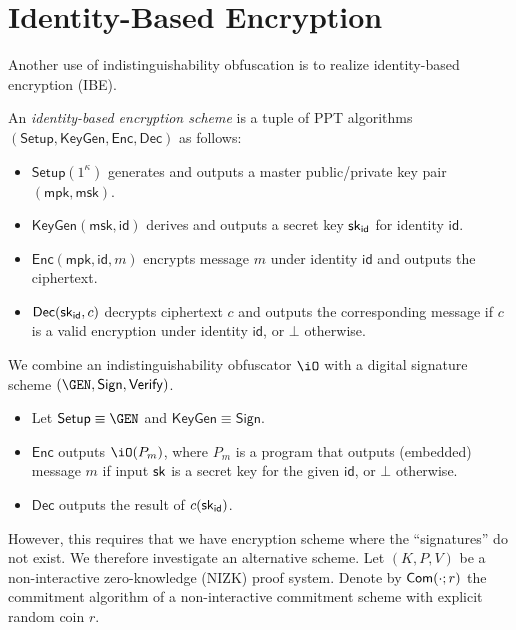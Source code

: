 \documentclass[12pt]{tufte-book}
\newcommand{\Enc}{\mathsf{Enc}}
\newcommand{\Dec}{\mathsf{Dec}}
\begin{document}
\section{Identity-Based Encryption}

Another use of indistinguishability obfuscation is to realize
identity-based encryption (IBE).

\newcommand{\SETUP}{\ensuremath{\mathsf{Setup}}}
\newcommand{\KEYGEN}{\ensuremath{\mathsf{KeyGen}}}
\newcommand{\mpk}{\ensuremath{\mathsf{mpk}}}
\newcommand{\msk}{\ensuremath{\mathsf{msk}}}
\newcommand{\id}{\ensuremath{\mathsf{id}}}

\begin{definition}
An \emph{identity-based encryption scheme} is a tuple of PPT algorithms
$(\SETUP, \KEYGEN, \Enc, \Dec)$ as follows:
\begin{itemize}
\item
	$\SETUP(1^\kappa)$ generates and outputs a master public/private
	key pair $(\mpk, \msk)$.
\item
	$\KEYGEN(\msk, \id)$ derives and outputs a secret key
	$\sk_{\id}$ for identity $\id$.
\item
	$\Enc(\mpk, \id, m)$ encrypts message $m$ under identity $\id$
	and outputs the ciphertext.
\item
	$\Dec(\sk_{\id}, c)$ decrypts ciphertext $c$ and outputs the
	corresponding message if $c$ is a valid encryption under
	identity $\id$, or $\bot$ otherwise.
\end{itemize}
\end{definition}

\newcommand{\SIGN}{\ensuremath{\mathsf{Sign}}}
\newcommand{\VERIFY}{\ensuremath{\mathsf{Verify}}}

We combine an indistinguishability obfuscator $\iO$ with a digital
signature scheme $(\GEN, \SIGN, \VERIFY)$.
\begin{itemize}
\item
	Let $\SETUP \equiv \GEN$ and $\KEYGEN \equiv \SIGN$.
\item
	$\Enc$ outputs $\iO(P_m)$, where $P_m$ is a program that
	outputs (embedded) message $m$ if input $\mathsf{sk}$ is a secret key for
	the given $\id$, or $\bot$ otherwise.
\item
	$\Dec$ outputs the result of $c(\sk_{\id})$.
\end{itemize}
However, this requires that we have encryption scheme where the
``signatures'' do not exist.
We therefore investigate an alternative scheme.
Let $(K, P, V)$ be a non-interactive zero-knowledge (NIZK) proof system.
Denote by $\mathsf{Com}(\cdot ; r)$ the commitment algorithm of a non-interactive
commitment scheme with explicit random coin $r$.
\end{document}
